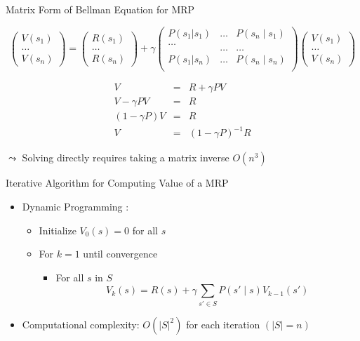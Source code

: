 \documentclass[aspectratio=169]{../latex_main/tntbeamer}  %
\begin{document}
\begin{frame}[c]{Matrix Form of Bellman Equation for MRP}

$$\begin{pmatrix}
V(s_1)\\
\ldots\\
V(s_n)
\end{pmatrix} =
\begin{pmatrix}
R(s_1)\\
\ldots\\
R(s_n)
\end{pmatrix} 
+ \gamma 
\begin{pmatrix}
P(s_1|s_1)  & \ldots &  P(s_n \mid s_1)\\
\ldots\\ 	& \ldots & \ldots \\
P(s_1| s_n) & \ldots & P(s_n \mid s_n)\\
\end{pmatrix} 
\begin{pmatrix}
V(s_1)\\
\ldots\\
V(s_n)
\end{pmatrix} 
$$

\pause

\begin{eqnarray}
V &=& R + \gamma P V\\
V  - \gamma P V &=& R\\
(1- \gamma P) V  &=& R\\
V &=& (1- \gamma P)^{-1} R
\end{eqnarray}

\pause
$\leadsto$ Solving directly requires taking a matrix inverse $O(n^3)$

\end{frame}
\begin{frame}[c]{Iterative Algorithm for Computing Value of a MRP}

\begin{itemize}
	\item Dynamic Programming :
	\begin{itemize}
	\item Initialize $V_0(s) = 0$ for all $s$
	\item For $k=1$ until convergence
	\begin{itemize}
		\item For all $s$ in $S$
		$$V_k(s) = R(s) + \gamma \sum_{s' \in S} P(s' \mid s) V_{k-1}(s')$$
	\end{itemize}
	\end{itemize}

	\pause
	\smallskip
	\item Computational complexity: $O(|S|^2 )$ for each iteration $(|S| = n)$
\end{itemize}

\end{frame}
\end{document}
